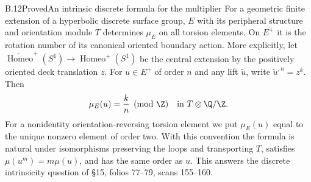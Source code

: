 \begin{claim}{B.12}{Proved}{An intrinsic discrete formula for the multiplier}
For a geometric finite extension of a hyperbolic discrete surface group,
$E$ with its peripheral structure and orientation module $T$ determines
$\mu_E$ on all torsion elements. On $E^+$ it is the rotation number of its
canonical oriented boundary action. More explicitly, let
$\widetilde{\operatorname{Homeo}}^+(S^1)\to\operatorname{Homeo}^+(S^1)$ be the
central extension by the positively oriented deck translation $z$. For
$u\in E^+$ of order $n$ and any lift $\widetilde u$, write
$\widetilde u^{,n}=z^k$. Then
\[
 \mu_E(u)=\frac{k}{n}\pmod{\Z}\quad\hbox{in }T\otimes\Q/\Z.
\]
For a nonidentity orientation-reversing torsion element we put
$\mu_E(u)$ equal to the unique nonzero element of order two. With this
convention the formula is natural under isomorphisms preserving the loops and
transporting $T$, satisfies $\mu(u^m)=m\mu(u)$, and has the same order as $u$.
This answers the discrete intrinsicity question of \S15, folios 77--79,
scans 155--160.
\end{claim}
